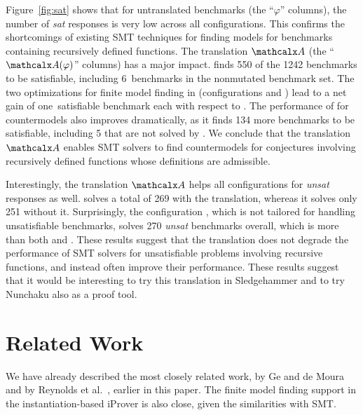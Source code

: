 Figure~\ref{fig:sat} shows that for untranslated benchmarks (the ``$\varphi$''
columns), the number of \emph{sat} responses is very low across all
configurations. This confirms the shortcomings of existing SMT techniques for
finding models for benchmarks containing recursively defined functions.
%
The translation $\conv$ (the ``$\conv(\varphi)$'' columns) has a major
impact. \cvcf finds 550 of the 1242 benchmarks to be satisfiable,
including 6~benchmarks in the nonmutated \leon benchmark set.
The two optimizations for finite model finding in \cvc (configurations \cvcfe and \cvcfm)
lead to a net gain of one~satisfiable benchmark each with respect to \cvcf.
The performance of \ziiib for countermodels also improves dramatically, as it
finds 134 more benchmarks to be satisfiable, including 5 that are not solved by \cvcf.
%
We conclude that the translation $\conv$ enables SMT
solvers to find countermodels for conjectures involving recursively defined
functions whose definitions are admissible.

Interestingly,
the translation $\conv$ helps all configurations for \emph{unsat} responses as well.
\ziii solves a total of 269 with the translation, whereas it solves only 251 without it.
Surprisingly,
the configuration \cvcf, which is not tailored for handling unsatisfiable benchmarks,
solves 270 \emph{unsat} benchmarks overall, which is more than both \cvcd and \ziii.
These results suggest that the translation does not degrade the performance
of SMT solvers for unsatisfiable problems involving recursive functions,
and instead often improve their performance. 
These results suggest that it would be interesting to try this translation
in Sledgehammer \cite{blanchette-et-al-2013-smt} and to try Nunchaku also as a
proof tool.

\section{Related Work}
\label{sec:related-work}

We have already described the most closely related work, by Ge and de Moura
\cite{GeDeM-CAV-09} and by Reynolds et al.\
\cite{ReyEtAl-1-RR-13,reynolds-et-al-2013}, earlier in this paper.
The finite model finding support in the instantiation-based iProver
\cite{korovin-2013} is also close, given the similarities with SMT.


